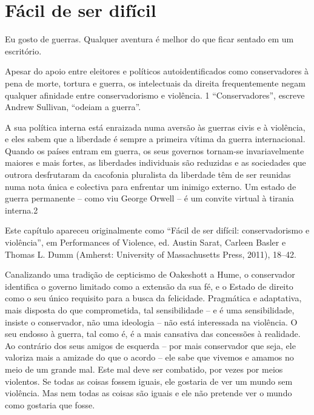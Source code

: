 \chapter{Fácil de ser difícil}\label{Fácil de ser difícil}
 \par 
Eu gosto de guerras. Qualquer aventura é melhor do que ficar sentado em um escritório.
 \par 
Apesar do apoio entre eleitores e políticos autoidentificados como conservadores à pena de morte, tortura e guerra, os intelectuais da direita frequentemente negam qualquer afinidade entre conservadorismo e violência. {\color{blue}1} “Conservadores”, escreve Andrew Sullivan, “odeiam a guerra”.
 \par 
A sua política interna está enraizada numa aversão às guerras civis e à violência, e eles sabem que a liberdade é sempre a primeira vítima da guerra internacional. Quando os países entram em guerra, os seus governos tornam-se invariavelmente maiores e mais fortes, as liberdades individuais são reduzidas e as sociedades que outrora desfrutaram da cacofonia pluralista da liberdade têm de ser reunidas numa nota única e colectiva para enfrentar um inimigo externo. Um estado de guerra permanente – como viu George Orwell – é um convite virtual à tirania interna.{\color{blue}2}
 \par 
Este capítulo apareceu originalmente como “Fácil de ser difícil: conservadorismo e violência”, em Performances of Violence, ed. Austin Sarat, Carleen Basler e Thomas L. Dumm (Amherst: University of Massachusetts Press, 2011), 18–42.
 \par 
Canalizando uma tradição de cepticismo de Oakeshott a Hume, o conservador identifica o governo limitado como a extensão da sua fé, e o Estado de direito como o seu único requisito para a busca da felicidade. Pragmática e adaptativa, mais disposta do que comprometida, tal sensibilidade – e é uma sensibilidade, insiste o conservador, não uma ideologia – não está interessada na violência. O seu endosso à guerra, tal como é, é a mais cansativa das concessões à realidade. Ao contrário dos seus amigos de esquerda – por mais conservador que seja, ele valoriza mais a amizade do que o acordo – ele sabe que vivemos e amamos no meio de um grande mal. Este mal deve ser combatido, por vezes por meios violentos. Se todas as coisas fossem iguais, ele gostaria de ver um mundo sem violência. Mas nem todas as coisas são iguais e ele não pretende ver o mundo como gostaria que fosse.
 \par 
